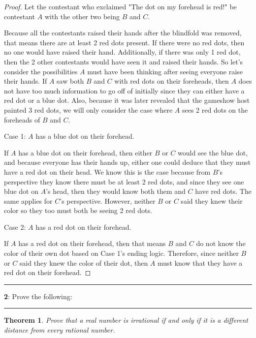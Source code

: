 \documentclass[11pt]{article}
\newtheorem{theorem}{Theorem}
\newcommand\question[2]{\vspace{.25in}\hrule\textbf{#1}: #2\vspace{.5em}\hrule\vspace{.10in}}
\begin{document}
\begin{proof}
	Let the contestant who exclaimed "The dot on my forehead is red!" be contestant $A$ with the other two being $B$ and $C$. 

	Because all the contestants raised their hands after the blindfold was removed, that means there are at least 2 red dots present. If there were no red dots, then no one would have raised their hand. Additionally, if there was only 1 red dot, then the 2 other contestants would have seen it and raised their hands. So let's consider the possibilities $A$ must have been thinking after seeing everyone raise their hands. If $A$ saw both $B$ and $C$ with red dots on their foreheads, then $A$ does not have too much information to go off of initially since they can either have a red dot or a blue dot. Also, because it was later revealed that the gameshow host painted 3 red dots, we will only consider the case where $A$ sees 2 red dots on the foreheads of $B$ and $C$.

	Case 1: $A$ has a blue dot on their forehead.

	If $A$ has a blue dot on their forehead, then either $B$ or $C$ would see the blue dot, and because everyone has their hands up, either one could deduce that they must have a red dot on their head. We know this is the case because from $B$'s perspective they know there must be at least 2 red dots, and since they see one blue dot on $A$'s head, then they would know both them and $C$ have red dots. The same applies for $C$'s perspective. However, neither $B$ or $C$ said they knew their color so they too must both be seeing 2 red dots.

	Case 2: $A$ has a red dot on their forehead.

	If $A$ has a red dot on their forehead, then that means $B$ and $C$ do not know the color of their own dot based on Case 1's ending logic. Therefore, since neither $B$ or $C$ said they knew the color of their dot, then $A$ must know that they have a red dot on their forehead.
\end{proof}



\question{2}{Prove the following:}
\begin{theorem}
	Prove that a real number is irrational if and only if it is a different distance from every rational number.
\end{theorem}
\end{document}
